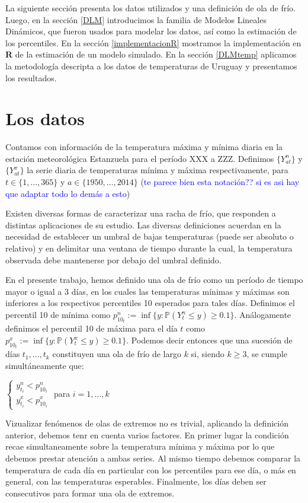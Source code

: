 \documentclass[12pt]{article}\usepackage[]{graphicx}\usepackage[]{color}
\newcommand{\p}{\mathbb{P}}
\begin{document}
La siguiente sección presenta los datos utilizados y una definición de ola de frío. Luego, en la sección \ref{DLM} introducimos la familia de Modelos Lineales Dinámicos, que fueron usados para modelar los datos, así como la estimación de los percentiles. En la sección \ref{implementacionR} mostramos la implementación en \textbf{R} de la estimación de un modelo simulado. En la sección \ref{DLMtemp} aplicamos la metodología descripta a los datos de temperaturas de Uruguay y presentamos los resultados.

\section{Los datos}

Contamos con información de la temperatura máxima y mínima diaria en la estación meteorológica Estanzuela para el período XXX a ZZZ. Definimos $\{Y^n_{at}\}$ y $\{Y^x_{at}\}$ la serie diaria de temperaturas mínima y máxima respectivamente, para $t \in \{1,\dots, 365\}$ y $a \in \{1950,\dots, 2014\}$ (\textcolor{blue}{te parece bien esta notación?? si es asi hay que adaptar todo lo demás a esto})

Existen diversas formas de caracterizar una racha de frío, que responden a distintas aplicaciones de su estudio. Las diversas definiciones acuerdan en la necesidad de establecer un umbral de bajas temperaturas (puede ser absoluto o relativo) y en delimitar una ventana de tiempo durante la cual, la temperatura observada debe mantenerse por debajo del umbral definido. 

En el presente trabajo, hemos definido una ola de frío como un período de tiempo mayor o igual a 3 días, en los cuales las temperaturas mínimas y máximas son inferiores a los respectivos percentiles 10 esperados para tales días. Definimos el percentil 10 de mínima como $p^n_{10_t}:= \inf\{y: \p(Y^n_t \leq y)\geq 0.1\}$. Análogamente definimos el percentil 10 de máxima para el día $t$ como $p^x_{10_t}:= \inf\{y: \p(Y^x_t \leq y)\geq 0.1\}$. Podemos decir entonces que una sucesión de días $t_1, \dots, t_k$ constituyen una ola de frío de largo $k$ si, siendo $k\geq 3$, se cumple simultáneamente que:

$\begin{cases} y^n_{t_i} < p^n_{10_i}  \\ y^x_{t_i} < p^x_{10_i} \end{cases}$ para $i=1,\dots,k$

Vizualizar fenómenos de olas de extremos no es trivial, aplicando la definición anterior, debemos tenr en cuenta varios factores. En primer lugar la condición recae simultaneamente sobre la temperatura mínima y máxima por lo que debemos prestar atención a ambas series. Al mismo tiempo debemos comparar la temperatura de cada día en particular con los percentiles para ese día, o más en general, con las temperaturas esperables. Finalmente, los días deben ser consecutivos para formar una ola de extremos. 
\end{document}
